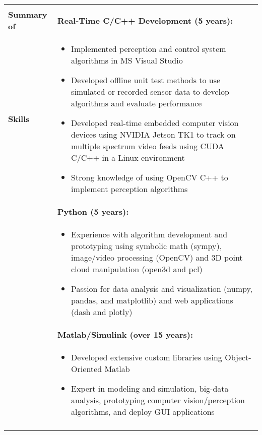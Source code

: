 \begin{tabular}{L{\hlcolw}  L{\rcolw}}
	\hline \\
	\textbf{\Large Summary of } & 
	\textbf{Real-Time C/C++ Development (5 years):}
	\\
	
	\textbf{\Large Skills} & 
	\vspace{-0.25in}
	\begin{itemize}[leftmargin = \itemmargin]
		\item Implemented perception and control system algorithms in MS Visual Studio
		
		\item Developed offline unit test methods to use simulated or recorded sensor data to develop algorithms and evaluate performance
	
		\item Developed real-time embedded computer vision devices using NVIDIA Jetson TK1 to track on multiple spectrum video feeds using CUDA C/C++ in a Linux environment
		
		\item Strong knowledge of using OpenCV C++ to implement perception algorithms
	
	\end{itemize} \\
	
	& \textbf{Python (5 years):} \\
	&
	\vspace{-0.25in}
	\begin{itemize}[leftmargin = \itemmargin]
		\item Experience with algorithm development and prototyping using symbolic math (sympy), image/video processing (OpenCV) and 3D point cloud manipulation (open3d and pcl)
		
		\item Passion for data analysis and visualization (numpy, pandas, and matplotlib) and web applications (dash and plotly)
	\end{itemize}
	\\
	
	& \textbf{Matlab/Simulink (over 15 years):} \\
	& 	
	\vspace{-0.25in}
	\begin{itemize}[leftmargin = \itemmargin]
		
		\item Developed extensive custom libraries using Object-Oriented Matlab
		
		\item Expert in modeling and simulation, big-data analysis, prototyping computer vision/perception algorithms, and deploy GUI applications
		
	\end{itemize} 
	\\
	
	\hline \\
\end{tabular}